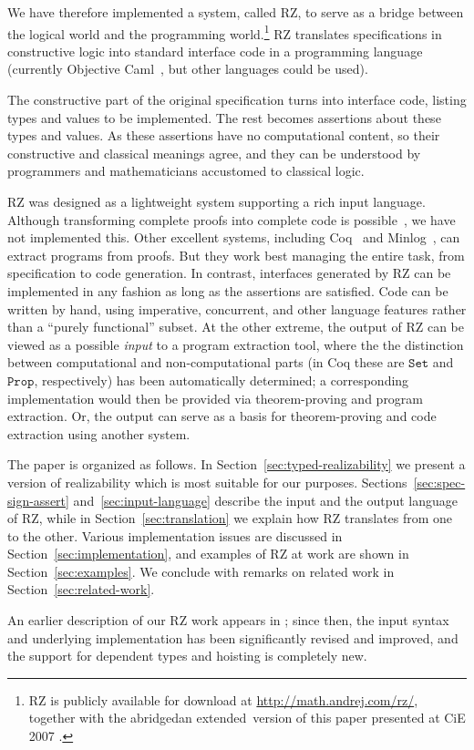 
We have therefore implemented a system, called RZ, to serve as a
bridge between the logical world and the programming
world.\footnote{RZ is publicly available for download at
  \url{http://math.andrej.com/rz/}, together with \iflong
  the abridged\else an extended\fi\ version of this paper
  \iflong presented at CiE 2007 \cite{bauer+:cie07}\fi.} RZ translates
specifications in constructive logic into standard interface code in a
programming language (currently Objective Caml~\cite{ocaml}, but other
languages could be used).

The constructive part of the original specification turns into
interface code, listing types and values to be implemented. The rest
becomes assertions about these types and values. As these assertions have
no computational content, so their constructive and classical meanings
agree, and they can be understood by programmers and mathematicians
accustomed to classical logic.


RZ was designed as a lightweight system
supporting a rich input language. Although transforming complete
proofs into complete code is possible~\cite{komagata+:tr95}, we have not
implemented this. Other excellent systems, including Coq~\cite{coqart} and
Minlog~\cite{benl98:_proof_theor_work}, can
extract programs from proofs. But they work best managing the entire
task, from specification to code generation. In contrast, interfaces generated by RZ can be
implemented in any fashion as long as the assertions are satisfied.
Code can be written by hand, using imperative, concurrent, and other language features
rather than a ``purely functional'' subset. 
\iflong
At the other
extreme, the output of RZ can be viewed as a possible \emph{input} to
a program extraction tool, where the the distinction between
computational and non-computational parts (in Coq these are
$\mathtt{Set}$ and $\mathtt{Prop}$, respectively) has been
automatically determined; a corresponding implementation would then be
provided via theorem-proving and program extraction.
\else %
Or, the output can serve as a basis for theorem-proving and code
extraction using another system.
\fi

\iflong
The paper is organized as follows. In
Section~\ref{sec:typed-realizability} we present a version of
realizability which is most suitable for our purposes.
Sections~\ref{sec:spec-sign-assert} and~\ref{sec:input-language}
describe the input and the output language of RZ, while in
Section~\ref{sec:translation} we explain how RZ translates from one to
the other. Various implementation issues are discussed in
Section~\ref{sec:implementation}, and examples of RZ at work are shown
in Section~\ref{sec:examples}. We conclude with remarks on related
work in Section~\ref{sec:related-work}.
\fi %

An earlier description of our RZ work appears in \cite{bauer+:clase05};
since then, the input syntax and underlying implementation has been
significantly revised and improved, and the support for dependent types and
hoisting is completely new.

